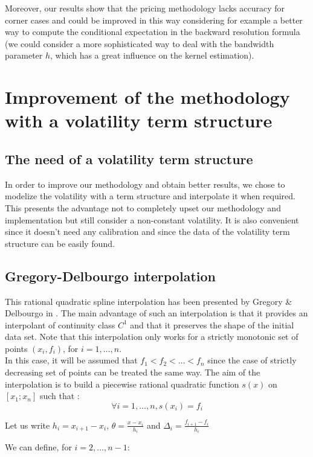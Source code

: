 \documentclass[a4paper,11pt,english]{book}
\begin{document}
Moreover, our results show that the pricing methodology lacks accuracy for corner cases and could be improved in this way considering for example a better way to compute the conditional expectation in the backward resolution formula (we could consider a more sophisticated way to deal with the bandwidth parameter $h$, which has a great influence on the kernel estimation).

\section{Improvement of the methodology with a volatility term structure}
\subsection{The need of a volatility term structure}
In order to improve our methodology and obtain better results, we chose to modelize the volatility with a term structure and interpolate it when required. This presents the advantage not to completely upset our methodology and implementation but still consider a non-constant volatility. It is also convenient since it doesn't need any calibration and since the data of the volatility term structure can be easily found.

\subsection{Gregory-Delbourgo interpolation}
This rational quadratic spline interpolation has been presented by Gregory \& Delbourgo in \cite{gregory1982piecewise}. The main advantage of such an interpolation is that it provides an interpolant of continuity class $C^1$ and that it preserves the shape of the initial data set. Note that this interpolation only works for a strictly monotonic set of points $(x_i,f_i)$, for $i=1,\ldots,n$. \\

In this case, it will be assumed that $f_1 < f_2 < \ldots< f_n$ since the case of strictly decreasing set of points can be treated the same way. The aim of the interpolation is to build a piecewise rational quadratic function $s(x)$ on $[x_1;x_n]$ such that :
$$\forall i=1,\ldots,n, s(x_i)=f_i$$

Let us write $h_i=x_{i+1}-x_i$, $\theta=\frac{x-x_i}{h_i}$ and $\Delta_i=\frac{f_{i+1}-f_i}{h_i}$

We can define, for $i=2,\ldots,n-1$: 
\end{document}
